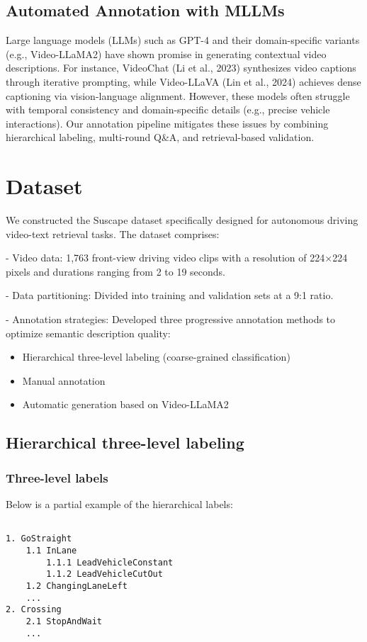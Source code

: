 \documentclass[lettersize,journal]{IEEEtran}
\begin{document}
\subsection{Automated Annotation with MLLMs}
Large language models (LLMs) such as GPT-4 and their domain-specific variants (e.g., Video-LLaMA2) have shown promise in generating contextual video descriptions. For instance, VideoChat (Li et al., 2023)\cite{li2023videochat} synthesizes video captions through iterative prompting, while Video-LLaVA (Lin et al., 2024)\cite{lin2024videollava} achieves dense captioning via vision-language alignment. However, these models often struggle with temporal consistency and domain-specific details (e.g., precise vehicle interactions). Our annotation pipeline mitigates these issues by combining hierarchical labeling, multi-round Q\&A, and retrieval-based validation.


\section{Dataset}
We constructed the Suscape dataset specifically designed for autonomous driving video-text retrieval tasks. The dataset comprises:

- Video data: 1,763 front-view driving video clips with a resolution of 224×224 pixels and durations ranging from 2 to 19 seconds.

- Data partitioning: Divided into training and validation sets at a 9:1 ratio.

- Annotation strategies: Developed three progressive annotation methods to optimize semantic description quality:

\begin{itemize}
    \item Hierarchical three-level labeling (coarse-grained classification)
    \item Manual annotation
    \item Automatic generation based on Video-LLaMA2
\end{itemize}

\subsection{Hierarchical three-level labeling}
\subsubsection{Three-level labels}

Below is a partial example of the hierarchical labels:
\begin{verbatim}

1. GoStraight
    1.1 InLane
        1.1.1 LeadVehicleConstant
        1.1.2 LeadVehicleCutOut
    1.2 ChangingLaneLeft
    ...
2. Crossing
    2.1 StopAndWait
    ...
\end{verbatim}
\end{document}
